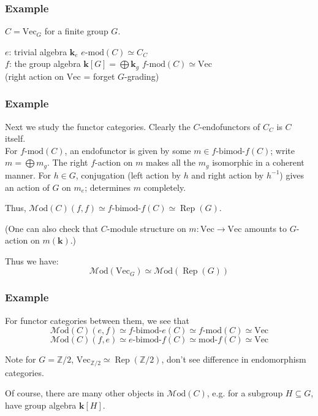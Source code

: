 \documentclass{beamer}
\newcommand{\kk}{{\mathbf{k}}}
\newcommand{\ZZ}{{\mathbb{Z}}}
\DeclareMathOperator{\Rep}{Rep}
\newcommand{\inv}{{-1}} %
\newcommand{\Vect}{{\textrm{Vec}}}
\newcommand{\bimod}[2]{{#1\textrm{-bimod-}#2}}
\newcommand{\amod}[1]{{#1\textrm{-mod}}}
\newcommand{\moda}[1]{{\textrm{mod-}#1}}
\newcommand{\Mod}{{\mathcal{M}\textrm{od}}}
\newcommand{\ModA}[1]{{\Mod(#1)}}
\begin{document}
\begin{frame}
\frametitle{Example}

$C = \Vect_{G}$ for a finite group $G$.

\pause
$e$: trivial algebra $\kk_e$
\;\;\;
$\amod{e}(C) \simeq C_C$
\\
\pause
$f$: the group algebra $\kk[G] = \bigoplus \kk_g$
\;\;\;
$\amod{f}(C) \simeq \Vect$\\
(right action on $\Vect$ = forget $G$-grading)

\end{frame}

\begin{frame}
\frametitle{Example}

Next we study the functor categories.
Clearly the $C$-endofunctors of $C_C$ is $C$ itself.
\\
\pause
For $\amod{f}(C)$,
an endofunctor is given by some $m \in \bimod{f}{f}(C)$;
write $m = \bigoplus m_g$.
\pause
The right $f$-action on $m$ makes all the $m_g$ isomorphic
in a coherent manner.
\pause
For $h \in G$, conjugation (left action by $h$ and right action
by $h^\inv$) gives an action of $G$ on $m_e$;
determines $m$ completely.

\pause
Thus, $\ModA{C}(f,f) \simeq \bimod{f}{f}(C) \simeq \Rep(G)$.

\pause
(One can also check that $C$-module structure on
$m: \Vect \to \Vect$
amounts to $G$-action on $m(\kk)$.)

Thus we have:
\[
\ModA{\Vect_G} \simeq \ModA{\Rep(G)}
\]

\end{frame}

\begin{frame}
\frametitle{Example}

For functor categories between them, we see that
\[
\ModA{C}(e,f) \simeq \bimod{f}{e}(C) \simeq \amod{f}(C)
\simeq \Vect
\]
\[
\ModA{C}(f,e) \simeq \bimod{e}{f}(C) \simeq \moda{f}(C)
\simeq \Vect
\]

\pause
Note for $G = \ZZ/2$,
$\Vect_{\ZZ/2} \simeq \Rep(\ZZ/2)$,
don't see difference in endomorphism categories.

\pause
Of course, there are many other objects in $\ModA{C}$,
e.g. for a subgroup $H \subseteq G$,
have group algebra $\kk[H]$.

\end{frame}
\end{document}
